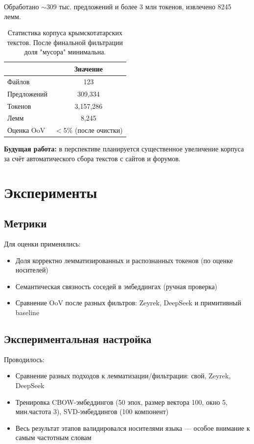 \documentclass{article}
\begin{document}
Обработано $\sim$309 тыс. предложений и более 3 млн токенов, извлечено 8245 лемм.

\begin{table}[tbh!]
\begin{center}
\begin{tabular}[t]{|l|c|}
\hline
 & Значение \\
\hline
Файлов & 123  \\
Предложений & 309,334 \\
Токенов & 3,157,286 \\
Лемм & 8,245 \\
Оценка OoV & $<$5\% (после очистки) \\
\hline
\end{tabular}
\caption{Статистика корпуса крымскотатарских текстов. После финальной фильтрации доля "мусора" минимальна.}
\label{tab:statistics}
\end{center}
\end{table}

\textbf{Будущая работа:} в перспективе планируется существенное увеличение корпуса за счёт автоматического сбора текстов с сайтов и форумов.

\section{Эксперименты}
\subsection{Метрики}
Для оценки применялись:
\begin{itemize}
    \item Доля корректно лемматизированных и распознанных токенов (по оценке носителей)
    \item Семантическая связность соседей в эмбеддингах (ручная проверка)
    \item Сравнение OoV после разных фильтров: Zeyrek, DeepSeek и примитивный baseline
\end{itemize}

\subsection{Экспериментальная настройка}
Проводилось:
\begin{itemize}
    \item Сравнение разных подходов к лемматизации/фильтрации: свой, Zeyrek, DeepSeek
    \item Тренировка CBOW-эмбеддингов (50 эпох, размер вектора 100, окно 5, мин.частота 3), SVD-эмбеддингов (100 компонент)
    \item Весь результат этапов валидировался носителями языка — особое внимание к самым частотным словам
\end{itemize}
\end{document}
